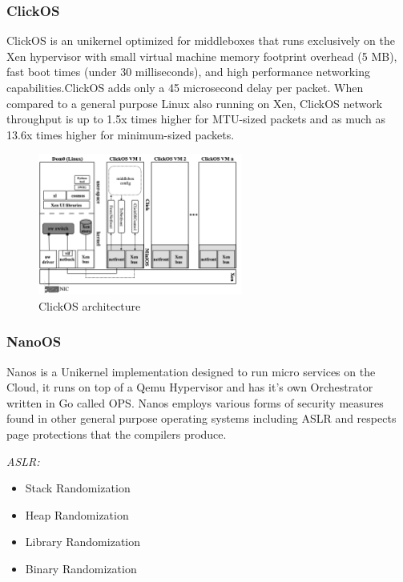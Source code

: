 \subsubsection{ClickOS}
ClickOS\cite{ClickOS} is an unikernel optimized for middleboxes that runs exclusively on
the Xen hypervisor with small virtual machine memory footprint overhead
(5 MB), fast boot times (under 30 milliseconds), and high performance
networking capabilities.ClickOS adds only a 45 microsecond delay per
packet. When compared to a general purpose Linux also running on Xen,
ClickOS network throughput is up to 1.5x times higher for MTU-sized packets
and as much as 13.6x times higher for minimum-sized packets. 

\begin{figure}[htbp!] 
  \centering    
  \includegraphics[width=0.6\textwidth]{ClickOSStack}
  \caption[ClickOS]{ClickOS architecture \cite{ClickOS}}
  \label{fig:ClickOSStack}
  \end{figure}

\subsubsection{NanoOS \cite{NanoOS}}
Nanos is a Unikernel implementation designed to run micro services on the 
Cloud, it runs on top of a Qemu Hypervisor and has it's own Orchestrator 
written in Go called OPS. 
Nanos employs various forms of security measures found in other general purpose operating systems including ASLR and respects page protections 
that the compilers produce.

\emph{ASLR:}

\begin{itemize}
  \item Stack Randomization
  \item Heap Randomization
  \item Library Randomization
  \item Binary Randomization
\end{itemize}

